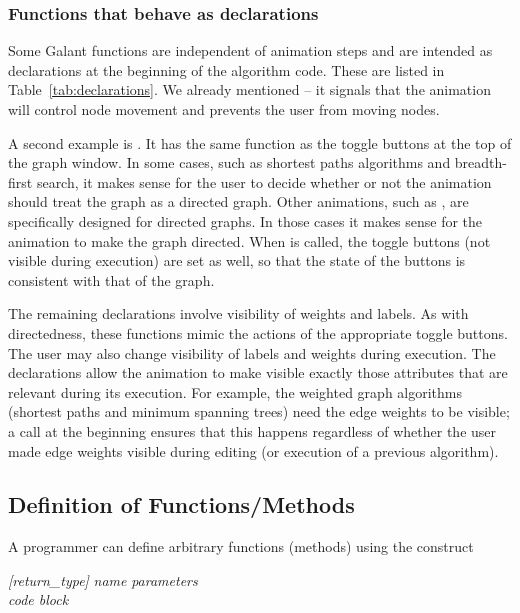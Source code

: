 

\subsubsection{Functions that behave as declarations} \label{sec:declarations}

Some Galant functions are independent of animation steps and are intended as
declarations at the beginning of the algorithm code.
These are listed in Table~\ref{tab:declarations}.
We already mentioned  -- it signals that the animation
will control node movement and prevents the user from moving nodes.

A second example is . It has the same function as the
toggle buttons at the top of the graph window. In some cases, such as
shortest paths algorithms and breadth-first search, it makes sense for the
user to decide whether or not the animation should treat the graph as a
directed graph. Other animations, such as , are specifically
designed for directed graphs. In those cases it makes sense for the animation
to make the graph directed. When  is called, the toggle
buttons (not visible during execution) are set as well, so that the state of
the buttons is consistent with that of the graph.

The remaining declarations involve visibility of weights and labels. As with
directedness, these functions mimic the actions of the appropriate toggle
buttons. The user may also change visibility of labels and weights during
execution. The declarations allow the animation to make visible exactly those
attributes that are relevant during its execution.
For example, the weighted graph algorithms (shortest paths and minimum
spanning trees) need the edge weights to be visible; a
 call at the beginning ensures that this happens
regardless of whether the user made edge weights visible during editing (or
execution of a previous algorithm).

\subsection{Definition of Functions/Methods}\label{sec:functions}

A programmer can define arbitrary functions (methods) using the construct

 \textsl{[return\_type]} \textsl{name} \Code{(}
 \textsl{parameters} \Code{) \{} \\
 \hspace*{3em} \emph{code block} \\
 \Code{\}}


